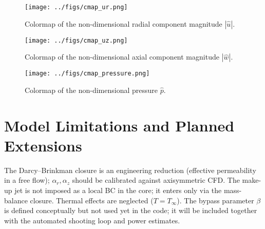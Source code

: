 \documentclass[11pt,a4paper]{article}
\begin{document}
\begin{figure}[H]
  \centering
  \texttt{[image: ../figs/cmap\_ur.png]}
  \caption{Colormap of the non-dimensional radial component magnitude $|\hat u|$.}
  \label{fig:cmap_ur}
\end{figure}

\begin{figure}[H]
  \centering
  \texttt{[image: ../figs/cmap\_uz.png]}
  \caption{Colormap of the non-dimensional axial component magnitude $|\hat w|$.}
  \label{fig:cmap_uz}
\end{figure}

\begin{figure}[H]
  \centering
  \texttt{[image: ../figs/cmap\_pressure.png]}
  \caption{Colormap of the non-dimensional pressure $\hat p$.}
  \label{fig:cmap_p}
\end{figure}

\section{Model Limitations and Planned Extensions}
The Darcy--Brinkman closure is an engineering reduction (effective permeability in a
free flow); $\alpha_r,\alpha_z$ should be calibrated against axisymmetric CFD.
The make-up jet is not imposed as a local BC in the core; it enters only via the
mass-balance closure. Thermal effects are neglected ($T=T_\infty$). The bypass parameter
$\beta$ is defined conceptually but not used yet in the code; it will be included together
with the automated shooting loop and power estimates.
\end{document}

